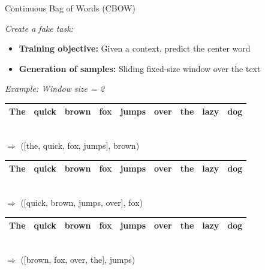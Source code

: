 \documentclass[11pt,compress,t,notes=noshow, xcolor=table]{beamer}
\begin{document}
\begin{vbframe}{Continuous Bag of Words (CBOW)}

\vfill

\textit{Create a fake task:}

\begin{itemize}
	\item \textbf{Training objective:} Given a context, predict the center word
	\item \textbf{Generation of samples:} Sliding fixed-size window over the text
\end{itemize}

\textit{Example: Window size = 2}

\medskip

\begin{tabular}{|c|c|c|c|c|cccc|}
\hline
\cellcolor{blue!15}The & \cellcolor{blue!15}quick & \cellcolor{blue!65}brown & \cellcolor{blue!15}fox & \cellcolor{blue!15}jumps & over & the & lazy & dog \\
\hline
\end{tabular}\\
$\Rightarrow$ \qquad ([the, quick, fox, jumps], brown)
\begin{tabular}{|c|c|c|c|c|c|ccc|}
\hline
The & \cellcolor{blue!15}quick & \cellcolor{blue!15}brown & \cellcolor{blue!65}fox & \cellcolor{blue!15}jumps & \cellcolor{blue!15}over & the & lazy & dog \\
\hline
\end{tabular}\\
$\Rightarrow$ \qquad ([quick, brown, jumps, over], fox)
\begin{tabular}{|cc|c|c|c|c|c|cc|}
\hline
The & quick & \cellcolor{blue!15}brown & \cellcolor{blue!15}fox & \cellcolor{blue!65}jumps & \cellcolor{blue!15}over & \cellcolor{blue!15}the & lazy & dog \\
\hline
\end{tabular}\\
$\Rightarrow$ \qquad ([brown, fox, over, the], jumps)
\vfill

\end{vbframe}

\end{document}
